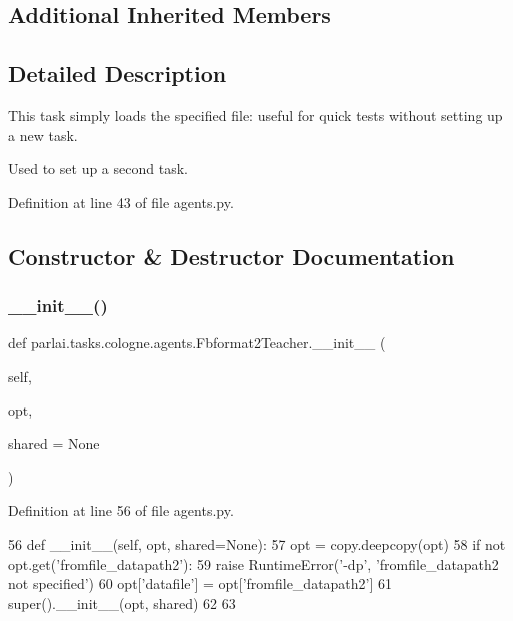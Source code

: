 \subsection*{Additional Inherited Members}


\subsection{Detailed Description}
\begin{DoxyVerb}This task simply loads the specified file: useful for quick tests without setting up
a new task.

Used to set up a second task.
\end{DoxyVerb}
 

Definition at line 43 of file agents.\+py.



\subsection{Constructor \& Destructor Documentation}
\mbox{\label{classparlai_1_1tasks_1_1cologne_1_1agents_1_1Fbformat2Teacher_ab0361ba169bc4a455265fd114358f237}} 
\subsubsection{\texorpdfstring{\+\_\+\+\_\+init\+\_\+\+\_\+()}{\_\_init\_\_()}}
{\footnotesize\ttfamily def parlai.\+tasks.\+cologne.\+agents.\+Fbformat2\+Teacher.\+\_\+\+\_\+init\+\_\+\+\_\+ (\begin{DoxyParamCaption}\item[{}]{self,  }\item[{}]{opt,  }\item[{}]{shared = {\ttfamily None} }\end{DoxyParamCaption})}



Definition at line 56 of file agents.\+py.


\begin{DoxyCode}
56     \textcolor{keyword}{def }\_\_init\_\_(self, opt, shared=None):
57         opt = copy.deepcopy(opt)
58         \textcolor{keywordflow}{if} \textcolor{keywordflow}{not} opt.get(\textcolor{stringliteral}{'fromfile\_datapath2'}):
59             \textcolor{keywordflow}{raise} RuntimeError(\textcolor{stringliteral}{'-dp'}, \textcolor{stringliteral}{'fromfile\_datapath2 not specified'})
60         opt[\textcolor{stringliteral}{'datafile'}] = opt[\textcolor{stringliteral}{'fromfile\_datapath2'}]
61         super().\_\_init\_\_(opt, shared)
62 
63 
\end{DoxyCode}


